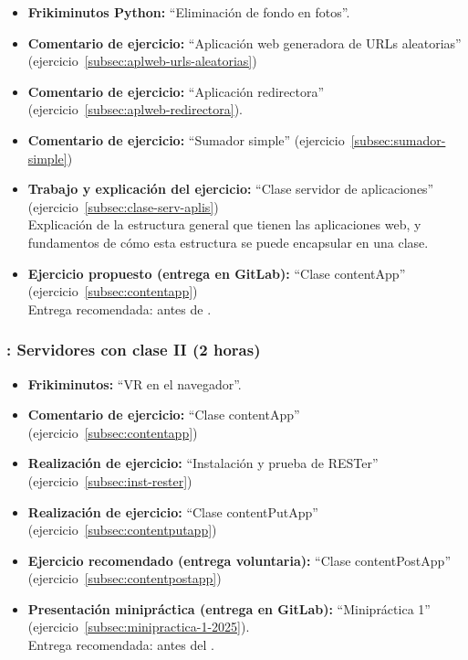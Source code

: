 \documentclass[a4paper,12pt]{article}
\begin{document}
\begin{itemize}
\item \textbf{Frikiminutos Python:} ``Eliminación de fondo en fotos''.
\item \textbf{Comentario de ejercicio:} ``Aplicación web generadora de URLs aleatorias'' (ejercicio~\ref{subsec:aplweb-urls-aleatorias})
\item \textbf{Comentario de ejercicio:} ``Aplicación redirectora'' (ejercicio~\ref{subsec:aplweb-redirectora}).
\item \textbf{Comentario de ejercicio:} ``Sumador simple'' (ejercicio~\ref{subsec:sumador-simple}) 
\item \textbf{Trabajo y explicación del ejercicio:} ``Clase servidor de aplicaciones'' (ejercicio~\ref{subsec:clase-serv-aplis}) \\
  Explicación de la estructura general que tienen las aplicaciones web, y fundamentos de cómo esta estructura se puede encapsular en una clase.
\item \textbf{Ejercicio propuesto (entrega en GitLab):}  ``Clase contentApp'' (ejercicio~\ref{subsec:contentapp}) \\
  Entrega recomendada: antes de \juevesF.
\end{itemize}


\subsubsection{\juevesF: Servidores con clase II (2 horas)}
\label{cal:juevesF}

\begin{itemize}
\item \textbf{Frikiminutos:} ``VR en el navegador''.
\item \textbf{Comentario de ejercicio:}  ``Clase contentApp'' (ejercicio~\ref{subsec:contentapp})
\item \textbf{Realización de ejercicio:}  ``Instalación y prueba de RESTer'' (ejercicio~\ref{subsec:inst-rester})
\item \textbf{Realización de ejercicio:}  ``Clase contentPutApp'' (ejercicio~\ref{subsec:contentputapp})
\item \textbf{Ejercicio recomendado (entrega voluntaria):} ``Clase contentPostApp'' (ejercicio~\ref{subsec:contentpostapp})
\item \textbf{Presentación minipráctica (entrega en GitLab):} ``Minipráctica 1'' (ejercicio~\ref{subsec:minipractica-1-2025}). \\
    Entrega recomendada: antes del \juevesH.
\end{itemize}
\end{document}
